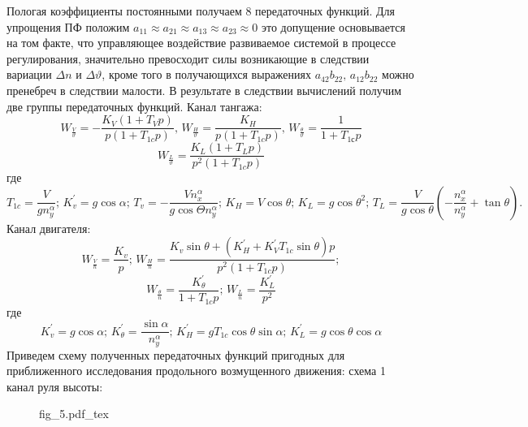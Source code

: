 \documentclass{article}
\begin{document}
Пологая коэффициенты постоянными получаем 8 передаточных функций. Для упрощения ПФ положим $a_{11} \approx a_{21} \approx a_{13} \approx a_{23} \approx 0$ это допущение основывается на том факте, что управляющее воздействие развиваемое системой в процессе регулирования, значительно превосходит силы возникающие в следствии вариации $\Delta n$ и $\Delta \vartheta$, кроме того в получающихся выражениях $a_{42} b_{22}, \, a_{12} b_{22}$ можно пренебреч в следствии малости.
В результате в следствии вычислений получим две группы передаточных функций.
Канал тангажа:\\
\[
W_{\frac{V}{\vartheta}} = -\frac{K_V(1+T_Vp)}{p(1+T_{1c}p)}, \, W_{\frac{H}{\vartheta}} = \frac{K_H}{p(1+T_{1c}p)}, \, W_{\frac{\theta}{\vartheta}} = \frac{1}{1+T_{1с}p}
\]
\[
W_{\frac{L}{\vartheta}} = \frac{K_L(1+T_Lp)}{p^2(1+T_{1c}p)}
\]
где\\
\[
T_{1c} = \frac{V}{g n_y^\alpha}; \, K_v^{'} = g\cos{\alpha}; \, T_v = -\frac{V n_x^\alpha}{g \cos{\Theta} n_y^\alpha};\, K_H = V \cos{\theta}; \, K_L = g \cos{\theta}^2 ;\, T_L= \frac{V}{g \cos{\theta}} (- \frac{n_x^\alpha}{n_y^\alpha} + \tan{\theta}).
\]
Канал двигателя:\\
\[
W_{\frac{V}{n}} = \frac{K_v}{p};\, W_{\frac{H}{n}} = \frac{K_v \sin{\theta} + (K_H^{'} + K_V^{'} T_{1c} \sin{\theta})p}{p^2(1+T_{1c}p)};
\]
\[
W_{\frac{\theta}{n}} = \frac{K_\theta^{'}}{1+T_{1c}p}; \, W_{\frac{L}{n}} = \frac{K_L^{'}}{p^2} 
\]
где \\
\[
K_v^{'} = g\cos{\alpha}; \, K_\theta^{'} = \frac{\sin{\alpha}}{n_y^\alpha}; \, K_H^{'} = gT_{1c} \cos{\theta}\sin{\alpha};\, K_L^{'} = g\cos{\theta} \cos{\alpha}
\]
Приведем схему полученных передаточных функций пригодных для приближенного исследования продольного возмущенного движения:
схема 1 канал руля высоты:
\begin{figure}[ht]
{fig_5.pdf_tex}
\end{figure}
\end{document}
